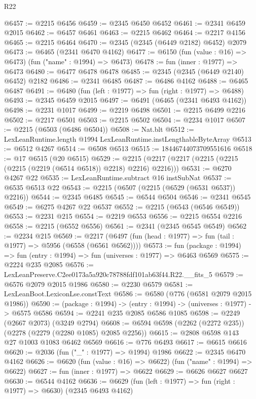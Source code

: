 \begin{lexlean}{R22}
\begin{coremodule}
@6457 := @2215 @6456
@6459 := @2345 @6450 @6452
@6461 := @2341 @6459 @2015
@6462 := @6457 @6461
@6463 := @2215 @6462
@6464 := @2217 @4156
@6465 := @2215 @6464
@6470 := @2345 (@2345 (@6449 @2182) @6452) @2079
@6473 := @6465 (@2341 @6470 @4162)
@6477 := @6150 (fun (value : @16) => @6473) (fun ("name" : @1994) => @6473)
@6478 := fun (inner : @1977) => @6473
@6480 := @6477 @6478 @6478
@6485 := @2345 (@2345 (@6449 @2140) @6452) @2182
@6486 := @2341 @6485
@6487 := @6486 @4162
@6488 := @6465 @6487
@6491 := @6480 (fun (left : @1977) => fun (right : @1977) => @6488)
@6493 := @2345 @6459 @2015
@6497 := @6491 (@6465 (@2341 @6493 @4162))
@6498 := @2231 @1017
@6499 := @2219 @6498
@6501 := @2215 @6499 @2216
@6502 := @2217 @6501
@6503 := @2215 @6502
@6504 := @2234 @1017
@6507 := @2215 (@6503 (@6486 @6504))
@6508 := Nat.blt
@6512 := LexLeanRuntime.length @1994 LexLeanRuntime.instLengthableByteArray
@6513 := @6512 @4267
@6514 := @6508 @6513
@6515 := 18446744073709551616
@6518 := @17 @6515 (@20 @6515)
@6529 := @2215 (@2217 (@2217 (@2215 (@2215 (@2215 (@2219 (@6514 @6518)) @2218) @2216) @2216)))
@6531 := @6270 @4267 @22
@6535 := LexLeanRuntime.subtract @16 instSubNat
@6537 := @6535 @6513 @22
@6543 := @2215 (@6507 (@2215 (@6529 (@6531 @6537)) @2216))
@6544 := @2345 @6485
@6545 := @6544 @6504
@6546 := @2341 @6545
@6549 := @6275 @4267 @22 @6537
@6552 := @2215 (@6543 (@6546 @6549))
@6553 := @2231 @215
@6554 := @2219 @6553
@6556 := @2215 @6554 @2216
@6558 := @2215 (@6552 @6556)
@6561 := @2341 (@2345 @6545 @6549)
@6562 := @2234 @215
@6569 := @2217 (@6497 (fun (head : @1977) => fun (tail : @1977) => @5956 (@6558 (@6561 @6562))))
@6573 := fun (package : @1994) => fun (entry : @1994) => fun (universes : @1977) => @6463 @6569
@6575 := @2224 @235 @2085
@6576 := LexLeanPreserve.C2ee0173a5a920c78788fdf101ab63f44.R22.__fits_5
@6579 := @6576 @2079 @2015 @1986
@6580 := @2230 @6579
@6581 := LexLeanBoot.LexiconLse.constText
@6586 := @6580 (@776 (@6581 @2079 @2015 @1986))
@6590 := (package : @1994) -> (entry : @1994) -> (universes : @1977) -> @6575 @6586
@6594 := @2241 @235 @2085 @6586 @1085
@6598 := @2249 (@2667 @2073) (@3249 @2794)
@6608 := @6594 @6598 (@2262 (@2272 @235)) (@2278 (@2279 (@2280 @1085) @2085 @2256))
@6615 := @2808 @6598 @143 @27 @1003 @1083 @6462 @6569
@6616 := @776 @6493
@6617 := @6615 @6616
@6620 := @2036 (fun ("_" : @1977) => @1994) @1986
@6622 := @2345 @6470 @4162
@6626 := @6620 (fun (value : @16) => @6622) (fun ("name" : @1994) => @6622)
@6627 := fun (inner : @1977) => @6622
@6629 := @6626 @6627 @6627
@6630 := @6544 @4162
@6636 := @6629 (fun (left : @1977) => fun (right : @1977) => @6630) (@2345 @6493 @4162)

\end{coremodule}
\end{lexlean}
